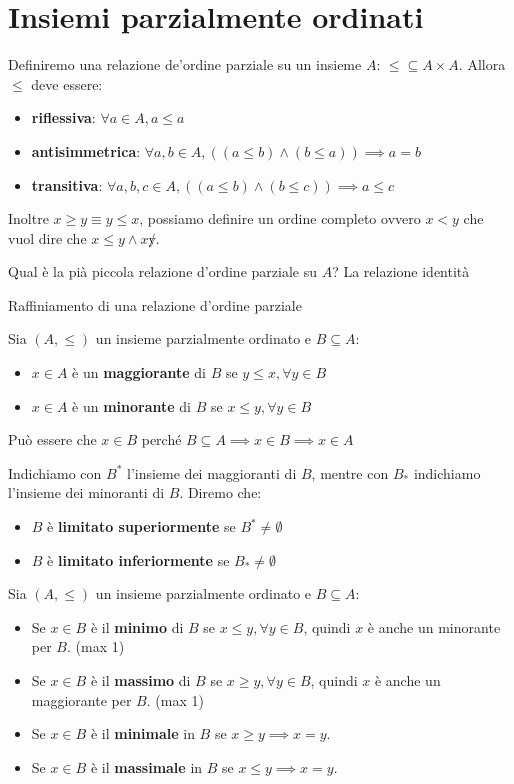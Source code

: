 \section{Insiemi parzialmente ordinati}
\begin{definizione}
    Definiremo una relazione de'ordine parziale su un insieme $A$: $\le\subseteq A\times A$.
    Allora $\le$ deve essere:
    \begin{itemize}
        \item \textbf{riflessiva}: $\forall a\in A, a\le a$
        \item \textbf{antisimmetrica}: $\forall a,b\in A, ((a\le b) \land (b\le a)) \implies a=b$
        \item \textbf{transitiva}: $\forall a,b,c\in A, ((a\le b) \land (b\le c)) \implies a\le c$
    \end{itemize}
\end{definizione}
Inoltre $x\ge y \equiv y\le x$, possiamo definire un ordine completo ovvero $x<y$
che vuol dire che $x\le y\land x\not y$.

Qual è la pià piccola relazione d'ordine parziale su $A$? La relazione identità

Raffiniamento di una relazione d'ordine parziale

\begin{definizione}
    Sia $(A,\le)$ un insieme parzialmente ordinato e $B\subseteq A$:
    \begin{itemize}
        \item $x\in A$ è un \textbf{maggiorante} di $B$ se $y\le x,\forall y\in B$
        \item $x\in A$ è un \textbf{minorante} di $B$ se $x\le y,\forall y\in B$
    \end{itemize}
    Può essere che $x\in B$ perché $B\subseteq A\implies x\in B\implies x\in A$
\end{definizione}
Indichiamo con $B^\ast$ l'insieme dei maggioranti di $B$, mentre con $B_\ast$ 
indichiamo l'insieme dei minoranti di $B$. Diremo che:
\begin{itemize}
    \item $B$ è \textbf{limitato superiormente} se $B^\ast \ne \emptyset$
    \item $B$ è \textbf{limitato inferiormente} se $B_\ast \ne \emptyset$
\end{itemize}
\begin{definizione}
    Sia $(A,\le)$ un insieme parzialmente ordinato e $B\subseteq A$:
    \begin{itemize}
        \item Se $x\in B$ è il \textbf{minimo} di $B$ se $x\le y,\forall y\in B$, 
        quindi $x$ è anche un minorante per $B$. (max 1)
        \item Se $x\in B$ è il \textbf{massimo} di $B$ se $x\ge y,\forall y\in B$, 
        quindi $x$ è anche un maggiorante per $B$. (max 1)
        \item Se $x\in B$ è il \textbf{minimale} in $B$ se $x\ge y \implies x=y$.
        \item Se $x\in B$ è il \textbf{massimale} in $B$ se $x\le y \implies x=y$.
    \end{itemize}      
\end{definizione}

